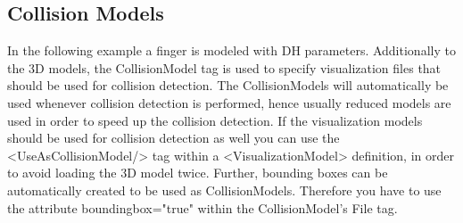 \subsection{Collision Models}
\par
In the following example a finger is modeled with DH parameters. Additionally to the 3D models, the CollisionModel tag is used to specify visualization files that should be used for collision detection. The CollisionModels will automatically be used whenever collision detection is performed, hence usually reduced models are used in order to speed up the collision detection. If the visualization models should be used for collision detection as well you can use the <UseAsCollisionModel/> tag within a <VisualizationModel> definition, in order to avoid loading the 3D model twice. Further, bounding boxes can be automatically created to be used as CollisionModels. Therefore you have to use the attribute boundingbox="true" within the CollisionModel's File tag. 
\par
